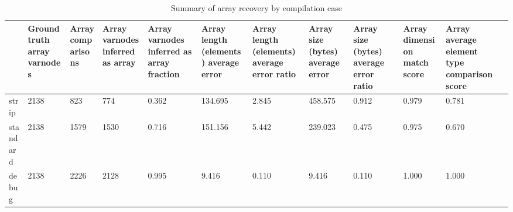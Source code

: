 \begin{table}
\centering
\caption{Summary of array recovery by compilation case}
\label{table:opts-array-comparisons-summary}
\begin{tabular}{lp{1.00cm}p{1.00cm}p{1.00cm}p{1.00cm}p{1.00cm}p{1.00cm}p{1.00cm}p{1.00cm}p{1.00cm}p{1.00cm}p{1.00cm}}
\toprule
{} &  Ground truth array varnodes &  Array comparisons &  Array varnodes inferred as array &  Array varnodes inferred as array fraction &  Array length (elements) average error &  Array length (elements) average error ratio &  Array size (bytes) average error &  Array size (bytes) average error ratio &  Array dimension match score &  Array average element type comparison score \\
\midrule
strip    &                         2138 &                823 &                               774 &                                      0.362 &                                134.695 &                                        2.845 &                           458.575 &                                   0.912 &                        0.979 &                                        0.781 \\
standard &                         2138 &               1579 &                              1530 &                                      0.716 &                                151.156 &                                        5.442 &                           239.023 &                                   0.475 &                        0.975 &                                        0.670 \\
debug    &                         2138 &               2226 &                              2128 &                                      0.995 &                                  9.416 &                                        0.110 &                             9.416 &                                   0.110 &                        1.000 &                                        1.000 \\
\bottomrule
\end{tabular}
\end{table}
